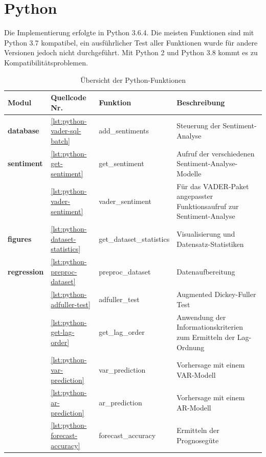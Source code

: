 \documentclass[
	a4paper,
	12pt,
	bibliography=totocnumbered,
	twoside,
]{scrreprt}
\begin{document}
\section{Python}
Die Implementierung erfolgte in Python 3.6.4. Die meisten Funktionen sind mit Python 3.7 kompatibel, ein ausführlicher Test aller Funktionen wurde für andere Versionen jedoch nicht durchgeführt. Mit Python 2 und Python 3.8 kommt es zu Kompatibilitätsproblemen.\\

\begin{table}[H]
	\centering
	\begin{tabular}{| p{2cm} | p{1cm} | p{4cm} | p{7.5cm} |}
		\hline
		\rowcolor{tubs_blue_light}
		Modul & Quellcode Nr. & Funktion & Beschreibung \\ \hline
		\textbf{database} & \ref{lst:python-vader-sql-batch} & add\_sentiments & Steuerung der Sentiment-Analyse \\ \hline
		\textbf{sentiment} & \ref{lst:python-get-sentiment} & get\_sentiment & Aufruf der verschiedenen Sentiment-Analyse-Modelle \\ \hline
		\ & \ref{lst:python-vader-sentiment} & vader\_sentiment & Für das VADER-Paket angepasster Funktionsaufruf zur Sentiment-Analyse \\ \hline
		\textbf{figures} & \ref{lst:python-dataset-statistics}  &  get\_dataset\_statistics & Visualisierung und Datensatz-Statistiken \\ \hline
		\textbf{regression} & \ref{lst:python-preproc-dataset}  &  preproc\_dataset & Datenaufbereitung \\ \hline
		\ & \ref{lst:python-adfuller-test}  &  adfuller\_test & Augmented Dickey-Fuller Test \\ \hline
		\ & \ref{lst:python-get-lag-order} & get\_lag\_order & Anwendung der Informationskriterien zum Ermitteln der Lag-Ordnung \\ \hline
		\ & \ref{lst:python-var-prediction} & var\_prediction & Vorhersage mit einem VAR-Modell \\ \hline
		\ & \ref{lst:python-ar-prediction} & ar\_prediction & Vorhersage mit einem AR-Modell \\ \hline
		\ & \ref{lst:python-forecast-accuracy} & forecast\_accuracy & Ermitteln der Prognosegüte \\ \hline
	\end{tabular}
	\caption{Übersicht der Python-Funktionen}
	\label{tab:python-functions}
\end{table}
\end{document}
